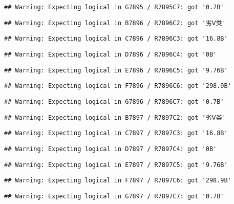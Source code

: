 \documentclass[
]{article}
\begin{document}
\begin{verbatim}
## Warning: Expecting logical in G7895 / R7895C7: got '0.7B'
\end{verbatim}

\begin{verbatim}
## Warning: Expecting logical in B7896 / R7896C2: got '劣Ⅴ类'
\end{verbatim}

\begin{verbatim}
## Warning: Expecting logical in C7896 / R7896C3: got '16.8B'
\end{verbatim}

\begin{verbatim}
## Warning: Expecting logical in D7896 / R7896C4: got '0B'
\end{verbatim}

\begin{verbatim}
## Warning: Expecting logical in E7896 / R7896C5: got '9.76B'
\end{verbatim}

\begin{verbatim}
## Warning: Expecting logical in F7896 / R7896C6: got '298.9B'
\end{verbatim}

\begin{verbatim}
## Warning: Expecting logical in G7896 / R7896C7: got '0.7B'
\end{verbatim}

\begin{verbatim}
## Warning: Expecting logical in B7897 / R7897C2: got '劣Ⅴ类'
\end{verbatim}

\begin{verbatim}
## Warning: Expecting logical in C7897 / R7897C3: got '16.8B'
\end{verbatim}

\begin{verbatim}
## Warning: Expecting logical in D7897 / R7897C4: got '0B'
\end{verbatim}

\begin{verbatim}
## Warning: Expecting logical in E7897 / R7897C5: got '9.76B'
\end{verbatim}

\begin{verbatim}
## Warning: Expecting logical in F7897 / R7897C6: got '298.9B'
\end{verbatim}

\begin{verbatim}
## Warning: Expecting logical in G7897 / R7897C7: got '0.7B'
\end{verbatim}
\end{document}
